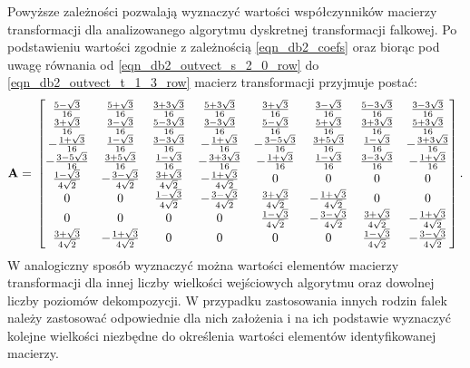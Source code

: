 Powyższe zależności pozwalają wyznaczyć wartości współczynników macierzy transformacji dla analizowanego algorytmu dyskretnej transformacji falkowej. Po podstawieniu wartości zgodnie z zależnością \eqref{eqn_db2_coefs} oraz biorąc pod uwagę równania od \eqref{eqn_db2_outvect_s_2_0_row} do \eqref{eqn_db2_outvect_t_1_3_row} macierz transformacji przyjmuje postać:
\begin{equation}
\mathbf{A} = \\
\begin{bmatrix}
\frac{5 - \sqrt{3}}{16} & \frac{5 + \sqrt{3}}{16} & \frac{3 + 3 \sqrt{3}}{16} & \frac{5 + 3 \sqrt{3}}{16} & \frac{3 + \sqrt{3}}{16} & \frac{3 - \sqrt{3}}{16} & \frac{5 - 3 \sqrt{3}}{16} & \frac{3 - 3 \sqrt{3}}{16} \\
\frac{3 + \sqrt{3}}{16} & \frac{3 - \sqrt{3}}{16} & \frac{5 - 3 \sqrt{3}}{16} & \frac{3 - 3 \sqrt{3}}{16} & \frac{5 - \sqrt{3}}{16} & \frac{5 + \sqrt{3}}{16} & \frac{3 + 3 \sqrt{3}}{16} & \frac{5 + 3 \sqrt{3}}{16} \\
- \frac{1 + \sqrt{3}}{16} & \frac{1 - \sqrt{3}}{16} & \frac{3 - 3 \sqrt{3}}{16} & - \frac{1 + \sqrt{3}}{16} & - \frac{3 - 5 \sqrt{3}}{16} & \frac{3 + 5 \sqrt{3}}{16} & \frac{1 - \sqrt{3}}{16} & - \frac{3 + 3 \sqrt{3}}{16} \\
- \frac{3 - 5 \sqrt{3}}{16} & \frac{3 + 5 \sqrt{3}}{16} & \frac{1 - \sqrt{3}}{16} & - \frac{3 + 3 \sqrt{3}}{16} & - \frac{1 + \sqrt{3}}{16} & \frac{1 - \sqrt{3}}{16} & \frac{3 - 3 \sqrt{3}}{16} & - \frac{1 + \sqrt{3}}{16} \\
\frac{1 - \sqrt{3}}{4 \sqrt{2}} & - \frac{3 - \sqrt{3}}{4 \sqrt{2}} & \frac{3 + \sqrt{3}}{4 \sqrt{2}} & - \frac{1 + \sqrt{3}}{4 \sqrt{2}} & 0 & 0 & 0 & 0 \\
0 & 0 & \frac{1 - \sqrt{3}}{4 \sqrt{2}} & - \frac{3 - \sqrt{3}}{4 \sqrt{2}} & \frac{3 + \sqrt{3}}{4 \sqrt{2}} & - \frac{1 + \sqrt{3}}{4 \sqrt{2}} & 0 & 0 \\
0 & 0 & 0 & 0 & \frac{1 - \sqrt{3}}{4 \sqrt{2}} & - \frac{3 - \sqrt{3}}{4 \sqrt{2}} & \frac{3 + \sqrt{3}}{4 \sqrt{2}} & - \frac{1 + \sqrt{3}}{4 \sqrt{2}} \\
\frac{3 + \sqrt{3}}{4 \sqrt{2}} & - \frac{1 + \sqrt{3}}{4 \sqrt{2}} & 0 & 0 & 0 & 0 & \frac{1 - \sqrt{3}}{4 \sqrt{2}} & - \frac{3 - \sqrt{3}}{4 \sqrt{2}}
\end{bmatrix}
\label{eqn_db2_2_8_matrix}.
\end{equation}
W analogiczny sposób wyznaczyć można wartości elementów macierzy transformacji dla innej liczby wielkości wejściowych algorytmu oraz dowolnej liczby poziomów dekompozycji. W przypadku zastosowania innych rodzin falek należy zastosować odpowiednie dla nich założenia i na ich podstawie wyznaczyć kolejne wielkości niezbędne do określenia wartości elementów identyfikowanej macierzy.

